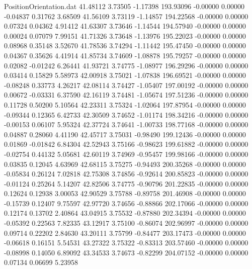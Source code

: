 \begin{filecontents}{PositionOrientation.dat}
  41.48112    3.73505   -1.17398   193.93096   -0.00000    0.00000   -0.04837    0.31762    3.68509
  41.56109    3.73119   -1.14857   194.22568   -0.00000    0.00000    0.07324    0.04362    4.91412
  41.63307    3.73646   -1.14544   194.57940   -0.00000    0.00000    0.00024    0.07079    7.99151
  41.71326    3.73648   -1.13976   195.22023   -0.00000    0.00000    0.08968    0.35148    3.52670
  41.78536    3.74294   -1.11442   195.47450   -0.00000    0.00000    0.04367    0.35626    4.41914
  41.85734    3.74609   -1.08878   195.79257   -0.00000    0.00000    0.02082   -0.01242    6.26441
  41.93721    3.74775   -1.08977   196.29296   -0.00000    0.00000    0.03414    0.15829    5.58973
  42.00918    3.75021   -1.07838   196.69521   -0.00000    0.00000   -0.08248    0.33773    4.26217
  42.08114    3.74427   -1.05407   197.00192   -0.00000    0.00000    0.00672   -0.03331    6.37590
  42.16119    3.74481   -1.05674   197.51236   -0.00000    0.00000    0.11728    0.50200    5.10564
  42.23311    3.75324   -1.02064   197.87954   -0.00000    0.00000   -0.09344    0.12365    6.42733
  42.30509    3.74652   -1.01174   198.34216   -0.00000    0.00000   -0.00153    0.06107    5.95324
  42.37724    3.74641   -1.00733   198.77168   -0.00000    0.00000    0.04887    0.28060    4.41190
  42.45717    3.75031   -0.98490   199.12436   -0.00000    0.00000    0.01869   -0.01842    6.84304
  42.52943    3.75166   -0.98623   199.61882   -0.00000    0.00000   -0.02754    0.44132    5.05681
  42.60119    3.74969   -0.95457   199.98166   -0.00000    0.00000    0.03835    0.12045    4.63969
  42.68115    3.75275   -0.94493   200.35268   -0.00000    0.00000   -0.05834    0.26124    7.02818
  42.75308    3.74856   -0.92614   200.85823   -0.00000    0.00000   -0.01124    0.25264    5.14207
  42.82506    3.74775   -0.90796   201.22835   -0.00000    0.00000    0.12624    0.12938    3.00053
  42.90529    3.75788   -0.89758   201.46908   -0.00000    0.00000   -0.15739    0.12407    9.75597
  42.97720    3.74656   -0.88866   202.17066   -0.00000    0.00000    0.12174    0.13702    2.40864
  43.04915    3.75532   -0.87880   202.34394   -0.00000    0.00000   -0.05392    0.22563    7.82335
  43.12917    3.75100   -0.86074   202.96997   -0.00000    0.00000    0.09714    0.22202    2.84630
  43.20111    3.75799   -0.84477   203.17473   -0.00000    0.00000   -0.06618    0.16151    5.54531
  43.27322    3.75322   -0.83313   203.57460   -0.00000    0.00000   -0.08998    0.14050    6.89092
  43.34533    3.74673   -0.82299   204.07152   -0.00000    0.00000    0.07134    0.06699    5.23958

\end{filecontents}

